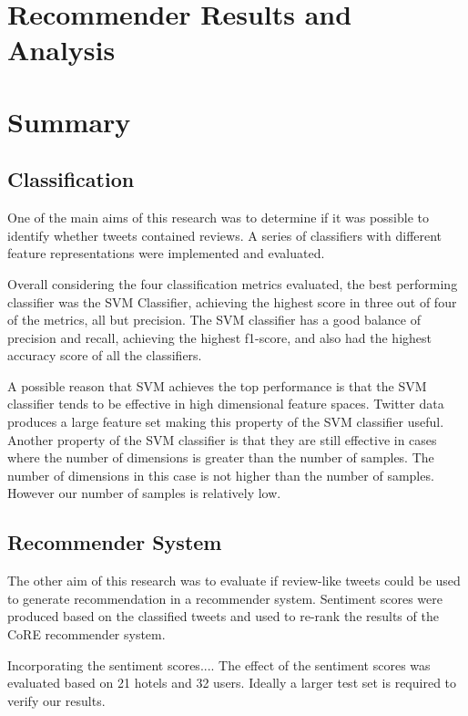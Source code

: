 \section{Recommender Results and Analysis}

\section{Summary}

\subsection*{Classification}

One of the main aims of this research was to determine if it was possible to identify whether tweets contained reviews. A series of classifiers with different feature representations were implemented and evaluated. 

Overall considering the four classification metrics evaluated, the best performing classifier was the SVM Classifier, achieving the highest score in three out of four of the metrics, all but precision. The SVM classifier has a good balance of precision and recall, achieving the highest f1-score, and also had the highest accuracy score of all the classifiers.

A possible reason that SVM achieves the top performance is that the SVM classifier tends to be effective in high dimensional feature spaces. Twitter data produces a large feature set making this property of the SVM classifier useful. Another property of the SVM classifier is that they are still effective in cases where the number of dimensions is greater than the number of samples. The number of dimensions in this case is not higher than the number of samples. However our number of samples is relatively low.

\subsection*{Recommender System}

The other aim of this research was to evaluate if review-like tweets could be used to generate recommendation in a recommender system. Sentiment scores were produced based on the classified tweets and used to re-rank the results of the CoRE recommender system. 

Incorporating the sentiment scores.... The effect of the sentiment scores was evaluated based on 21 hotels and 32 users. Ideally a larger test set is required to verify our results.


